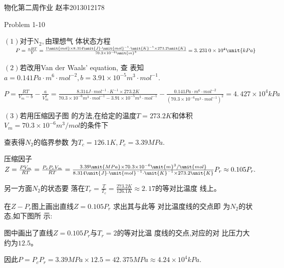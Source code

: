 \documentclass{article}
\begin{document}
\bigskip 物化第二周作业\qquad
\qquad \qquad 赵丰2013012178

Problem 1-10

$\left( 1\right) $对于N$_{2},$由理想气%
体状态方程$\qquad P=\frac{nRT}{V}=\frac{1\unit{%
mol}\times 8.314\unit{J}\cdot \unit{mol}^{-1}\cdot \unit{K}^{-1}\times 273.2%
\unit{K}}{70.3\times 10^{-6}\unit{m}^{3}}=\allowbreak 3.\,\allowbreak
231\,0\times 10^{4}\unit{kPa}$

$\left( 2\right) $若改用Van der Waals' equation, 查%
表知\qquad $a=0.141\unit{Pa}\cdot \unit{m}^{6}\cdot \unit{mol}%
^{-2},b=3.91\times 10^{-5}\unit{m}^{3}\cdot \unit{mol}^{-1}.$

$P=\frac{RT}{V_{m}-b}-\frac{a}{V_{m}^{2}}=\frac{8.314\unit{J}\cdot \unit{mol}%
^{-1}\cdot \unit{K}^{-1}\times 273.2\unit{K}}{70.3\times 10^{-6}\unit{m}%
^{3}\cdot \unit{mol}^{-1}-3.91\times 10^{-5}\unit{m}^{3}\cdot \unit{mol}^{-1}%
}-\frac{0.141\unit{Pa}\cdot \unit{m}^{6}\cdot \unit{mol}^{-2}}{\left(
70.3\times 10^{-6}\unit{m}^{3}\cdot \unit{mol}^{-1}\right) ^{2}}=\allowbreak
4.\,\allowbreak 427\times 10^{4}\unit{kPa}$

$\left( 3\right) $若用压缩因子图%
的方法,在给定的温度$%
T=273.2\unit{K}$和体积$V_{m}=70.3\times 10^{-6}\unit{m}%
^{3}/\unit{mol}$的条件下

查表得$N_{2}$的临界参数%
为$T_{c}=126.1\unit{K},P_{c}=3.39\unit{MPa}.$

压缩因子$Z=\frac{PV_{m}}{RT}=\frac{P_{r}P_{c}V_{m}}{%
RT}=\frac{3.39\unit{MPa}\times 70.3\times 10^{-6}\unit{m}^{3}/\unit{mol}}{%
8.314\unit{J}\cdot \unit{mol}^{-1}\cdot \unit{K}^{-1}\times 273.2\unit{K}}%
P_{r}\approx \allowbreak 0.105P_{r}.$

另一方面$N_{2}$的状态要%
落在$T_{r}=\frac{T}{T_{c}}=\frac{273.2\unit{K}}{126.1\unit{K}}%
\approx 2.\,\allowbreak 17$的等对比温度%
线上$。 $

在$Z-P_{r}$图上画出直线$%
\allowbreak Z=0.105P_{r}$ 求出其与此等%
对比温度线的交点即%
为$N_{2}$的状态,如下图所%
示$:$


图中画出了直线$\allowbreak
Z=0.105P_{r}$与$T_{r}=2$的等对比温%
度线的交点,对应的对%
比压力大约为$12.5。 $

因此$P=P_{c}P_{r}=3.39\unit{MPa}\times 12.5=\allowbreak
42.\,\allowbreak 375\unit{MPa}\approx 4.24\times 10^{4}\unit{kPa}.$
\end{document}
